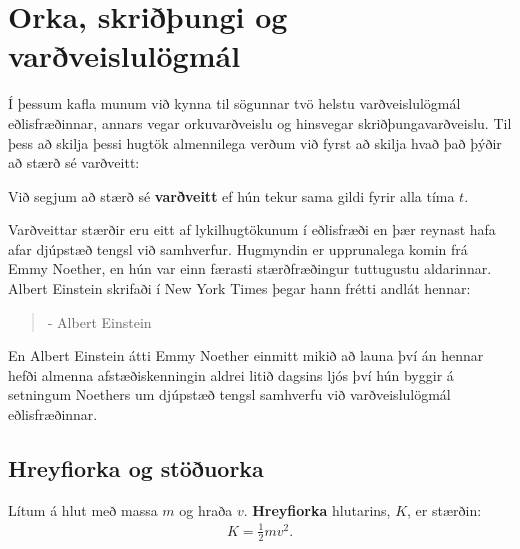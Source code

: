 \chapter{Orka, skriðþungi og varðveislulögmál}

Í þessum kafla munum við kynna til sögunnar tvö helstu varðveislulögmál eðlisfræðinnar, annars vegar orkuvarðveislu og hinsvegar skriðþungavarðveislu. Til þess að skilja þessi hugtök almennilega verðum við fyrst að skilja hvað það þýðir að stærð sé varðveitt:

\begin{tcolorbox}
\begin{definition}
Við segjum að stærð sé \textbf{varðveitt} ef hún tekur sama gildi fyrir alla tíma $t$.
\end{definition}
\end{tcolorbox}

Varðveittar stærðir eru eitt af lykilhugtökunum í eðlisfræði en þær reynast hafa afar djúpstæð tengsl við samhverfur. Hugmyndin er upprunalega komin frá Emmy Noether, en hún var einn færasti stærðfræðingur tuttugustu aldarinnar. Albert Einstein skrifaði í New York Times þegar hann frétti andlát hennar:

\begin{quote}
    \textit{}
    \begin{flushright}
    - Albert Einstein
    \end{flushright}
\end{quote}
En Albert Einstein átti Emmy Noether einmitt mikið að launa því án hennar hefði almenna afstæðiskenningin aldrei litið dagsins ljós því hún byggir á setningum Noethers um djúpstæð tengsl samhverfu við varðveislulögmál eðlisfræðinnar.

\section{Hreyfiorka og stöðuorka}

\begin{tcolorbox}
\begin{definition}
Lítum á hlut með massa $m$ og hraða $v$. 
\textbf{Hreyfiorka} hlutarins, $K$, er stærðin:
\begin{align*}
    K = \frac{1}{2}mv^2.
\end{align*}
\end{definition}
\end{tcolorbox}

